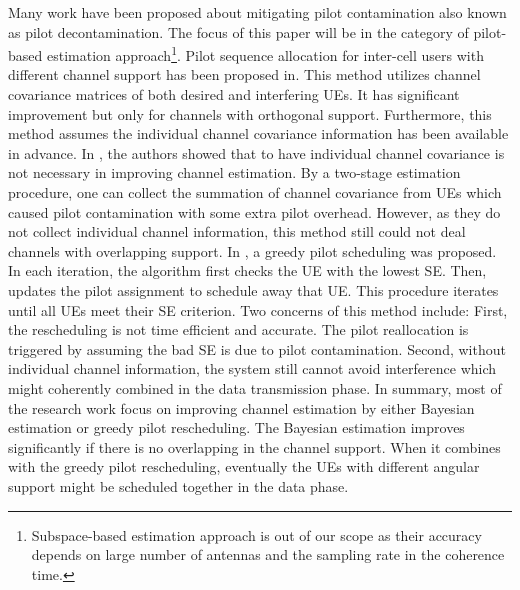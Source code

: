 Many work have been proposed about mitigating pilot contamination also known as pilot decontamination. The focus of this paper will be in the category of pilot-based estimation approach\cite{elijah2016comprehensive}\footnote{Subspace-based estimation approach is out of our scope as their accuracy depends on large number of antennas and the sampling rate in the coherence time\cite{elijah2016comprehensive}.}. Pilot sequence allocation for inter-cell users with different channel support has been proposed in\cite{yin2013coordinated,adhikary2013joint,you2015pilot}. This method utilizes channel covariance matrices of both desired and interfering UEs. It has significant improvement but only for channels with orthogonal support. Furthermore, this method assumes the individual channel covariance information has been available in advance. In \cite{bjornson2016massive}, the authors showed that to have individual channel covariance is not necessary in improving channel estimation. By a two-stage estimation procedure, one can collect the summation of channel covariance from UEs which caused pilot contamination with some extra pilot overhead. However, as they do not collect individual channel information, this method still could not deal channels with overlapping support. In \cite{ngo2017cell}, a greedy pilot scheduling was proposed. In each iteration, the algorithm first checks the UE with the lowest SE. Then, updates the pilot assignment to schedule away that UE. This procedure iterates until all UEs meet their SE criterion. Two concerns of this method include: First, the rescheduling is not time efficient and accurate. The pilot reallocation is triggered by assuming the bad SE is due to pilot contamination. Second, without individual channel information, the system still cannot avoid interference which might coherently combined in the data transmission phase. In summary, most of the research work focus on improving channel estimation by either Bayesian estimation or greedy pilot rescheduling. The Bayesian estimation improves significantly if there is no overlapping in the channel support. When it combines with the greedy pilot rescheduling, eventually the UEs with different angular support might be scheduled together in the data phase. 

